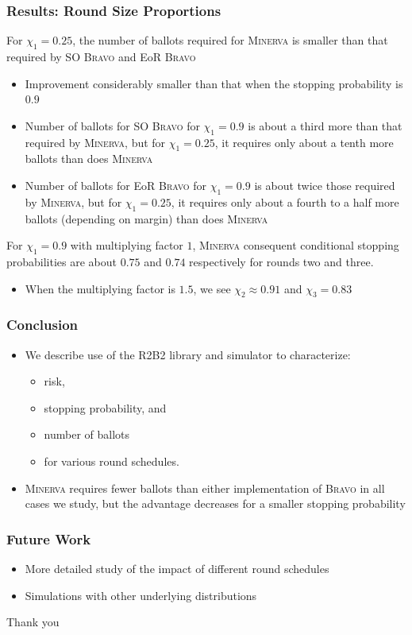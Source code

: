 \documentclass{beamer}
\newcommand{\Minerva}{\textsc{Minerva}\xspace}
\newcommand{\BRAVO}{\textsc{Bravo}\xspace}
\begin{document}
\begin{frame}
\frametitle{Results: Round Size Proportions}

For $\chi_1 = 0.25$, the number of ballots required for \Minerva is smaller than that required by SO \BRAVO and EoR \BRAVO
\begin{itemize}
\item Improvement considerably smaller than that when the stopping probability is $0.9$
\item Number of ballots for SO \BRAVO for $\chi_1 =0.9$ is about a third more than that required by \Minerva, but for $\chi_1 = 0.25$, it requires only about a tenth more ballots than does \Minerva
\item Number of ballots for EoR \BRAVO for $\chi_1 = 0.9$ is about twice those required by \Minerva, but for $\chi_1 =0.25$, it requires only about a fourth to a half more ballots (depending on margin) than does \Minerva

\end{itemize}
For $\chi_1 = 0.9$ with multiplying factor $1$, \Minerva consequent conditional stopping probabilities are about $0.75$ and $0.74$ respectively for rounds two and three. 
\begin{itemize}
\item When the multiplying factor is $1.5$, we see $\chi_2\approx 0.91$
and $\chi_3=0.83$
\end{itemize}

\end{frame}

\begin{frame}
\frametitle{Conclusion}

\begin{itemize}

\item We describe use of the R2B2 library and simulator to characterize: 
\begin{itemize}
\item risk, 
\item stopping probability, and 
\item number of ballots 
\item for various round schedules.
\end{itemize}
\item \Minerva requires fewer ballots than either implementation of \BRAVO in all cases we study, but the advantage decreases for a smaller stopping probability

\end{itemize}

\end{frame}

\begin{frame}
\frametitle{Future Work}
\begin{itemize}
\item More detailed study of the impact of different round schedules
\item Simulations with other underlying distributions
\end{itemize}
\end{frame}


\begin{frame}
\centering 
{Thank you}
\end{frame}



\end{document}
